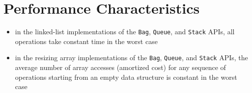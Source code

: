 \documentclass[8pt,a4paper,compress]{beamer}
\begin{document}
\section{Performance Characteristics}
\begin{frame}[fragile]
\begin{itemize}
\item in the linked-list implementations of the \lstinline{Bag}, \lstinline{Queue}, and \lstinline{Stack} APIs, all operations take constant time in the worst case

\item in the resizing array implementations of the \lstinline{Bag}, \lstinline{Queue}, and \lstinline{Stack} APIs, the average number of array accesses (amortized cost) for any sequence of operations starting from an empty data structure is constant in the worst case
\end{itemize}
\end{frame}
\end{document}
